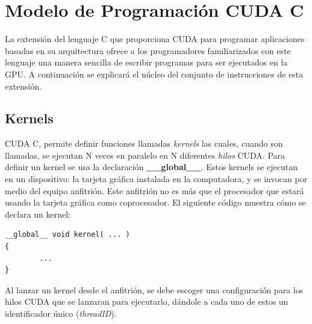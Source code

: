 \section{Modelo de Programación CUDA C}
La extensión del lenguaje C que proporciona CUDA para programar aplicaciones basadas en su arquitectura ofrece a los programadores familiarizados con este lenguaje una manera sencilla de escribir programas para ser ejecutados en la GPU. A continuación se explicará el núcleo del conjunto de instrucciones de esta extensión.
\subsection{Kernels}
CUDA C, permite definir funciones llamadas \textit{kernels} las cuales, cuando son llamadas, se ejecutan N veces en paralelo en N diferentes \textit{hilos} CUDA. Para definir un kernel se usa la declaración \textbf{\_\_global\_\_}. Estos kernels se ejecutan en un dispositivo: la tarjeta gráfica instalada en la computadora, y se invocan por medio del equipo anfitrión. Este anfitrión no es más que el procesador que estará usando la tarjeta gráfica como coprocesador. El siguiente código muestra cómo se declara un kernel: 
\singlespacing
{}
\begin{lstlisting}[caption=Declaración de un Kernel en CUDA C.]
__global__ void kernel( ... )
{
        ...
}
\end{lstlisting}
Al lanzar un kernel desde el anfitrión, se debe escoger una configuración para los hilos CUDA que se lanzaran para ejecutarlo, dándole a cada uno de estos un identificador único (\textit{threadID}). 
